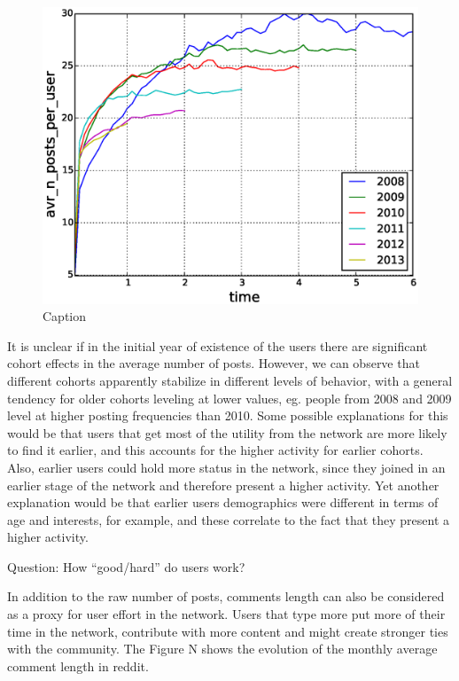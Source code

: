 \begin{figure}[!tb]
\centering
\includegraphics[scale=0.4]{./images/avr_posts_per_user_cohorts.eps}
\caption{Caption}
\label{fig:avr_posts_per_user_cohorts}
\end{figure}

It is unclear if in the initial year of existence of the users there are significant cohort effects in the average number of posts. However, we can observe that different cohorts apparently stabilize in different levels of behavior, with a general tendency for older cohorts leveling at lower values, eg. people from 2008 and 2009 level at higher posting frequencies than 2010. Some possible explanations for this would be that users that get most of the utility from the network are more likely to find it earlier, and this accounts for the higher activity for earlier cohorts. Also, earlier users could hold more status in the network, since they joined in an earlier stage of the network and therefore present a higher activity. Yet another explanation would be that earlier users demographics were different in terms of age and interests, for example, and these correlate to the fact that they present a higher activity.

Question: How ``good/hard'' do users work?

In addition to the raw number of posts, comments length can also be considered as a proxy for user effort in the network. Users that type more put more of their time in the network, contribute with more content and might create stronger ties with the community. The Figure N shows the evolution of the monthly average comment length in reddit.


